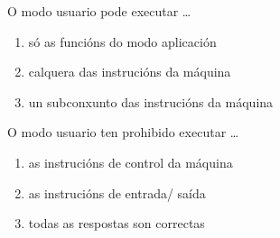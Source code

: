 \begin{diapo}\begin{frame}{O modo usuario pode executar \dots}
\begin{enumerate}
\item só as funcións do modo aplicación \pause
\item calquera das instrucións da máquina \pause
\item un subconxunto das instrucións da máquina
\end{enumerate} 
\end{frame} 
\end{diapo} 
\begin{diapo}\begin{frame}{O modo usuario ten prohibido  executar \dots}
\begin{enumerate}
\item  as instrucións de control da máquina \pause
\item  as instrucións de entrada/ saída\pause
\item todas as respostas son correctas
\end{enumerate} 
\end{frame} 
\end{diapo} 


